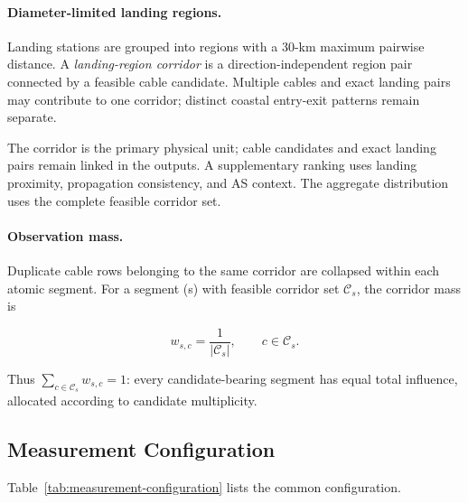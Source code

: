 \paragraph{Diameter-limited landing regions.}
Landing stations are grouped into regions with a 30-km maximum pairwise
distance. A \emph{landing-region corridor} is a direction-independent region
pair connected by a feasible cable candidate. Multiple cables and exact landing
pairs may contribute to one corridor; distinct coastal entry-exit patterns
remain separate.

The corridor is the primary physical unit; cable candidates and exact landing
pairs remain linked in the outputs. A supplementary ranking uses landing
proximity, propagation consistency, and AS context. The aggregate distribution
uses the complete feasible corridor set.

\paragraph{Observation mass.}
Duplicate cable rows belonging to the same corridor are collapsed within each
atomic segment. For a segment (s) with feasible corridor set
\(\mathcal{C}_s\), the corridor mass is

\begin{equation}
    w_{s,c}=\frac{1}{|\mathcal{C}_s|},
    \qquad c\in\mathcal{C}_s.
    \label{eq:uniform-mass}
\end{equation}

Thus \(\sum_{c\in\mathcal{C}_s} w_{s,c}=1\): every candidate-bearing segment has
equal total influence, allocated according to candidate multiplicity.

\subsection{Measurement Configuration}
\label{sec:framework_configuration}

Table~\ref{tab:measurement-configuration} lists the common configuration.

